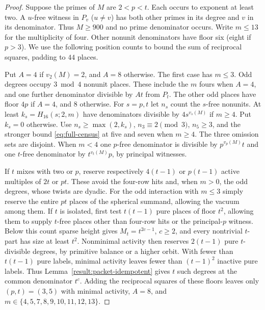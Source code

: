 \documentclass[11pt]{amsart}
\numberwithin{equation}{section}
\theoremstyle{definition}
\theoremstyle{plain}
\begin{document}
\begin{proof}
Suppose the primes of $M$ are $2<p<t$. Each occurs to
exponent at least two. A $u$-free witness in $P_v$ ($u\ne v$)
has both other primes in its degree and $v$ in its denominator.
Thus $M\ge900$ and no prime denominator occurs. Write $m\le13$ for
the multiplicity of four. Other nonunit denominators have floor six
(eight if $p>3$). We use the following position counts to bound the
sum of reciprocal squares, padding to $44$ places.

Put $A=4$ if $v_2(M)=2$, and $A=8$ otherwise. The first case has
$m\le3$. Odd degrees occupy $3\bmod4$ nonunit places. These include
the $m$ fours when $A=4$, and one further denominator divisible by
$At$ from $P_t$. The other odd places have floor $4p$ if $A=4$,
and $8$ otherwise. For $s=p,t$ let $n_s$ count the $s$-free
nonunits. At least $k_s=H_{16}(s;2,m)$ have denominators divisible
by $4s^{v_s(M)}$ if $m\ge4$. Put $k_s=0$ otherwise. Use
$n_s\ge\max(2,k_s)$, $n_3\equiv2\pmod3$, $n_5\ge3$, and the
stronger bound \eqref{eq:full-census} at five and seven when $m\ge4$.
The three omission sets are disjoint. When $m<4$ one $p$-free
denominator is divisible by $p^{v_p(M)}t$ and one $t$-free denominator
by $t^{v_t(M)}p$, by principal witnesses.

If $t$ mixes with two or $p$, reserve respectively $4(t-1)$ or
$p(t-1)$ active multiples of $2t$ or $pt$. These avoid the four-row
hits and, when $m>0$, the odd degrees, whose twists are dyadic. For
the odd interaction with $m\le3$ simply reserve the entire $pt$
places of the spherical summand, allowing the vacuum among them.
If $t$ is isolated, first test $t(t-1)$ pure places of floor $t^2$,
allowing them to supply $t$-free places other than four-row hits or
the principal-$p$ witness. Below this count sparse height gives
$M_t=t^{2c-1}$, $c\ge2$, and every nontrivial $t$-part has size
at least $t^2$. Nonminimal activity then reserves $2(t-1)$ pure
$t$-divisible degrees, by primitive balance or a higher orbit.
With fewer than $t(t-1)$ pure labels, minimal activity leaves fewer
than $(t-1)^2$ inactive pure labels. Thus Lemma~\ref{result:packet-idempotent} gives $t$
such degrees at the common denominator $t^c$.
Adding the reciprocal squares of these floors leaves only
$(p,t)=(3,5)$ with minimal activity, $A=8$, and
$m\in\{4,5,7,8,9,10,11,12,13\}$.


\end{proof}
\end{document}
